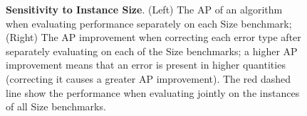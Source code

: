 \documentclass[10pt,onecolumn,letterpaper]{article}
\begin{document}
\begin{figure}[h!]
\centering
{}
\caption{ {\small \textbf{Sensitivity to Instance Size}.
(Left) The AP of an algorithm when evaluating performance separately on each Size benchmark;
(Right) The AP improvement when correcting each error type after separately evaluating on each of the Size benchmarks;
a higher AP improvement means that an error is present in higher quantities (correcting it causes a greater AP improvement).
The red dashed line show the performance when evaluating jointly on the instances of all Size benchmarks.}}
\end{figure}
\end{document}
